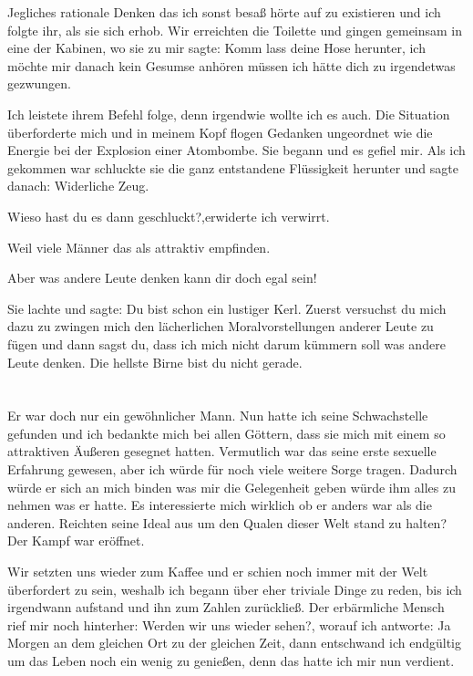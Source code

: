 \documentclass[11pt, a5paper]{article}
\begin{document}
\begin{spacing}{1.2}
		Jegliches rationale Denken das ich sonst besaß hörte auf zu existieren und ich folgte ihr, als sie sich erhob. Wir erreichten die Toilette und gingen gemeinsam in eine der Kabinen, wo sie zu mir sagte: \frqq Komm lass deine Hose herunter, ich möchte mir danach kein Gesumse anhören müssen ich hätte dich zu irgendetwas gezwungen.\flqq
		
		Ich leistete ihrem Befehl folge, denn irgendwie wollte ich es auch. Die Situation überforderte mich und in meinem Kopf flogen Gedanken ungeordnet wie die Energie bei der Explosion einer Atombombe. Sie begann und es gefiel mir. Als ich gekommen war schluckte sie die ganz entstandene Flüssigkeit herunter und sagte danach: \frqq Widerliche Zeug.\flqq
		
		\frqq Wieso hast du es dann geschluckt?\flqq ,erwiderte ich verwirrt.
		
		\frqq Weil viele Männer das als attraktiv empfinden.\flqq
		
		\frqq Aber was andere Leute denken kann dir doch egal sein!\flqq
		
		Sie lachte und sagte: \frqq Du bist schon ein lustiger Kerl. Zuerst versuchst du mich dazu zu zwingen mich den lächerlichen Moralvorstellungen anderer Leute zu fügen und dann sagst du, dass ich mich nicht darum kümmern soll was andere Leute denken. Die hellste Birne bist du nicht gerade.\flqq\newpage
		
		\section{}
		Er war doch nur ein gewöhnlicher Mann. Nun hatte ich seine Schwachstelle gefunden und ich bedankte mich bei allen Göttern, dass sie mich mit einem so attraktiven Äußeren gesegnet hatten. Vermutlich war das seine erste sexuelle Erfahrung gewesen, aber ich würde für noch viele weitere Sorge tragen. Dadurch würde er sich an mich binden was mir die Gelegenheit geben würde ihm alles zu nehmen was er hatte. Es interessierte mich wirklich ob er anders war als die anderen. Reichten seine Ideal aus um den Qualen dieser Welt stand zu halten? Der Kampf war eröffnet.
		
		Wir setzten uns wieder zum Kaffee und er schien noch immer mit der Welt überfordert zu sein, weshalb ich begann über eher triviale Dinge zu reden, bis ich irgendwann aufstand und ihn zum Zahlen zurückließ. Der erbärmliche Mensch rief mir noch hinterher: \frqq Werden wir uns wieder sehen?\flqq, worauf ich antworte: \frqq Ja Morgen an dem gleichen Ort zu der gleichen Zeit\flqq , dann entschwand ich endgültig um das Leben noch ein wenig zu genießen, denn das hatte ich mir nun verdient.
		

\end{spacing}
\end{document}
